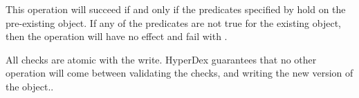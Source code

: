 This operation will succeed if and only if the predicates specified by
 hold on the pre-existing object.  If any of the predicates are not
true for the existing object, then the operation will have no effect and fail
with .

All checks are atomic with the write.  HyperDex guarantees that no other
operation will come between validating the checks, and writing the new version
of the object..
